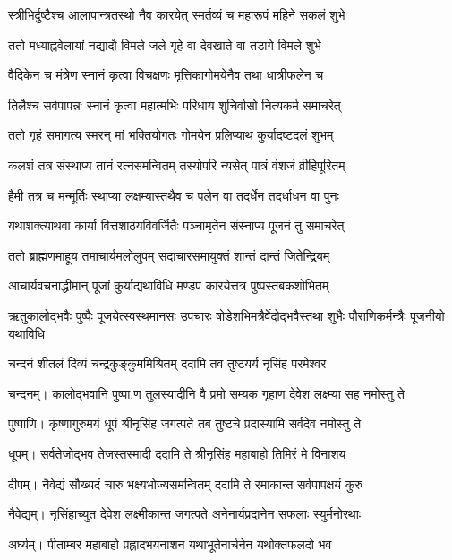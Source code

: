 \twolineshloka
{स्त्रीभिर्दुष्टैश्च आलापान्त्रतस्थो नैव कारयेत्}
{स्मर्तव्यं च महारूपं महिने सकलं शुभे} %

\twolineshloka
{ततो मध्याह्नवेलायां नद्यादौ विमले जले}
{गृहे वा देवखाते वा तडागे विमले शुभे} %

\twolineshloka
{वैदिकेन च मंत्रेण स्नानं कृत्वा विचक्षणः}
{मृत्तिकागोमयेनैव तथा धात्रीफलेन च} %

\twolineshloka
{तिलैश्च सर्वपापन्नः स्नानं कृत्वा महात्मभिः}
{परिधाय शुचिर्वासो नित्यकर्म समाचरेत्} %

\twolineshloka
{ततो गृहं समागत्य स्मरन् मां भक्तियोगतः}
{गोमयेन प्रलिप्याथ कुर्यादष्टदलं शुभम्} %

\twolineshloka
{कलशं तत्र संस्थाप्य तानं रत्नसमन्वितम्}
{तस्योपरि न्यसेत् पात्रं वंशजं व्रीहिपूरितम्} %

\twolineshloka
{हैमी तत्र च मन्मूर्तिः स्थाप्या लक्षम्यास्तथैव च}
{पलेन वा तदर्धेन तदर्धाधन वा पुनः} %

\twolineshloka
{यथाशक्त्याथवा कार्या वित्तशाठयविवर्जितैः}
{पञ्चामृतेन संस्नाप्य पूजनं तु समाचरेत्} %

\twolineshloka
{ततो ब्राह्मणमाहूय तमाचार्यमलोलुपम्}
{सदाचारसमायुक्तं शान्तं दान्तं जितेन्द्रियम्} %

\twolineshloka
{आचार्यवचनाद्धीमान् पूजां कुर्याद्यथाविधि}
{मण्डपं कारयेत्तत्र पुष्पस्तबकशोभितम्} %

\threelineshloka
{ऋतुकालोद्भवैः पुष्पैः पूजयेत्स्वस्थमानसः}
{उपचारः षोडेशभिमत्रैर्वेदोद्भवैस्तथा} %
{शुभैः पौराणिकर्मन्त्रैः पूजनीयो यथाविधि}

\twolineshloka
{चन्दनं शीतलं दिव्यं चन्द्रकुङ्कुममिश्रितम्}
{ददामि तव तुष्टयर्य नृसिंह परमेश्वर} %

चन्दनम्।
\twolineshloka
{कालोद्भवानि पुष्पा,ण तुलस्यादीनि वै प्रमो}
{सम्यक गृहाण देवेश लक्ष्म्या सह नमोस्तु ते} %

पुष्पाणि।
\twolineshloka
{कृष्णागुरुमयं धूपं श्रीनृसिंह जगत्पते}
{तब तुष्टचे प्रदास्यामि सर्वदेव नमोस्तु ते} %

धूपम्।
\twolineshloka
{सर्वतेजोद्भव तेजस्तस्मादी ददामि ते}
{श्रीनृसिंह महाबाहो तिमिरं मे विनाशय} %

दीपम्।
\twolineshloka
{नैवेद्यं सौख्यदं चारु भक्ष्यभोज्यसमन्वितम्}
{ददामि ते रमाकान्त सर्वपापक्षयं कुरु} %

नैवेद्यम्।
\twolineshloka
{नृसिंहाच्युत देवेश लक्ष्मीकान्त जगत्पते}
{अनेनार्यप्रदानेन सफलाः स्युर्मनोरथाः} %

अर्घ्यम्।
\twolineshloka
{पीताम्बर महाबाहो प्रह्लादभयनाशन}
{यथाभूतेनार्चनेन यथोक्तफलदो भव} %

